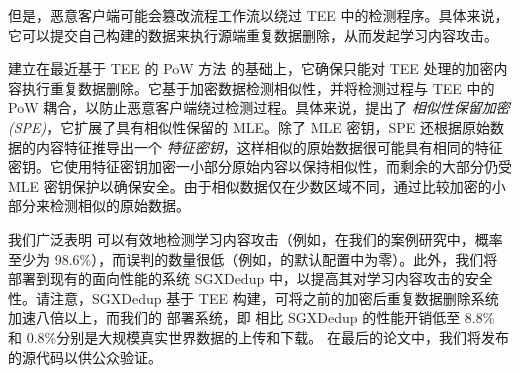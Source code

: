 但是，恶意客户端可能会篡改流程工作流以绕过 TEE 中的检测程序。具体来说，它可以提交自己构建的数据来执行源端重复数据删除，从而发起学习内容攻击。

\sysnameF 建立在最近基于 TEE 的 PoW 方法 \cite{ren21} 的基础上，它确保只能对 TEE 处理的加密内容执行重复数据删除。它基于加密数据检测相似性，并将检测过程与 TEE 中的 PoW 耦合，以防止恶意客户端绕过检测过程。具体来说，\sysnameF 提出了 {\em 相似性保留加密 (SPE)}，它扩展了具有相似性保留的 MLE。除了 MLE 密钥，SPE 还根据原始数据的内容特征推导出一个 {\em 特征密钥}，这样相似的原始数据很可能具有相同的特征密钥。它使用特征密钥加密一小部分原始内容以保持相似性，而剩余的大部分仍受 MLE 密钥保护以确保安全。由于相似数据仅在少数区域不同，\sysnameF 通过比较加密的小部分来检测相似的原始数据。


我们广泛表明 \sysnameF 可以有效地检测学习内容攻击（例如，在我们的案例研究中，概率至少为 98.6\%），而误判的数量很低（例如，\sysnameF 的默认配置中为零）。此外，我们将 \sysnameF 部署到现有的面向性能的系统 SGXDedup \cite{ren21} 中，以提高其对学习内容攻击的安全性。请注意，SGXDedup 基于 TEE 构建，可将之前的加密后重复数据删除系统 \cite{bellare13b} 加速八倍以上，而我们的 \sysnameF 部署系统，即 \prototype 相比 SGXDedup 的性能开销低至 8.8\% 和 0.8\%分别是大规模真实世界数据的上传和下载。
在最后的论文中，我们将发布 \prototype 的源代码以供公众验证。